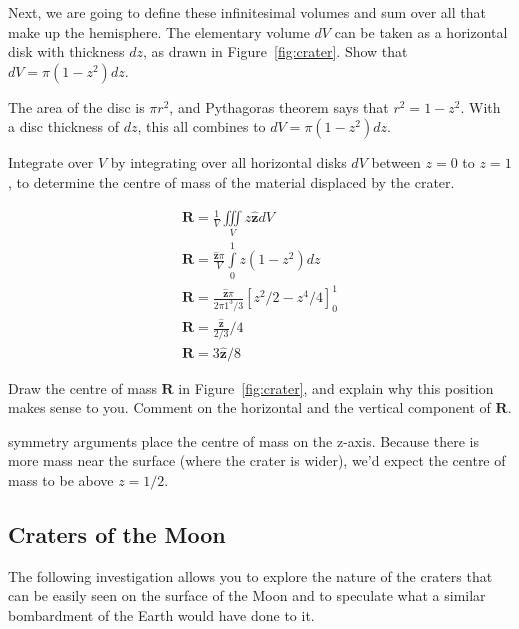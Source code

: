 \documentclass[addpoints]{exam}
\begin{document}
\begin{questions}
  Next, we are going to define these infinitesimal volumes and sum over
  all that make up the hemisphere. The elementary volume $dV$ can be
  taken as a horizontal disk with thickness $dz$, as drawn in
  Figure~\ref{fig:crater}. \question[10] Show that
  $dV= \pi \left(1-z^2\right)dz$.
  \begin{solutionorlines}[2in]
    The area of the disc is $\pi r^2$, and Pythagoras theorem says that
    $r^2 = 1-z^2$. With a disc thickness of $dz$, this all combines to
    $dV= \pi \left(1-z^2\right)dz$.
  \end{solutionorlines}
  \question[10] Integrate over $V$ by integrating over all horizontal
  disks $dV$ between $z=0$ to $z=1$, to determine the centre of mass of
  the material displaced by the crater.
  \begin{solutionorlines}[2.5in]
    \begin{align*} 
      \mathbf{R} = \frac{1}{V}\iiint \limits _{V}z\hat{\mathbf{z}}dV\\
      \mathbf{R} = \frac{\hat{\mathbf{z}}\pi}{V}\int \limits _{0}^1 z 
      \left(1-z^2\right)dz\\
      \mathbf{R} = \frac{\hat{\mathbf{z}}\pi}{2\pi 1^3/3}\left[z^2/2-z^4/4
      \right]_0^1\\
      \mathbf{R} = \frac{\hat{\mathbf{z}}}{2/3}/4\\
      \mathbf{R} = 3\hat{\mathbf{z}}/8    
    \end{align*}
  \end{solutionorlines}
  \question[10] Draw the centre of mass $\mathbf{R}$ in
  Figure~\ref{fig:crater}, and explain why this position makes sense to
  you. Comment on the horizontal and the vertical component of
  $\mathbf{R}$.
  \begin{solutionorlines}[2in]
    symmetry arguments place the centre of mass on the z-axis. Because
    there is more mass near the surface (where the crater is wider),
    we'd expect the centre of mass to be above $z=1/2$.
  \end{solutionorlines}
  
  \subsection{Craters of the Moon}
  \label{sec:moon}
  
  The following investigation allows you to explore the nature of the
  craters that can be easily seen on the surface of the Moon and to
  speculate what a similar bombardment of the Earth would have done to
  it.


\end{questions}
\end{document}
